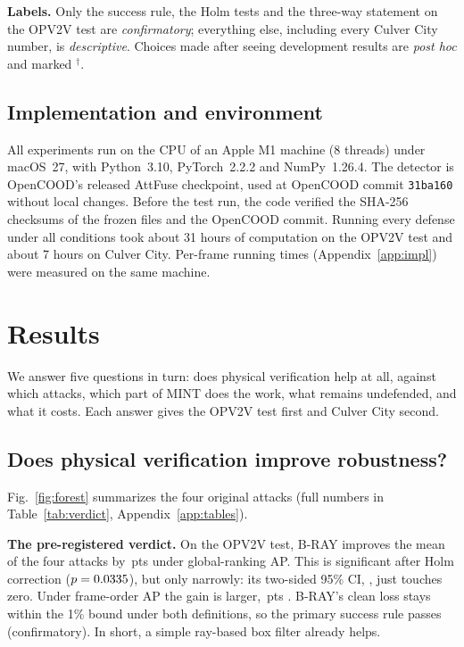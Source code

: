 \documentclass[conference]{IEEEtran}
\newcommand{\mint}{MINT}
\newcommand{\pts}{\,pts}
\begin{document}
\textbf{Labels.} Only the success rule, the Holm tests and the three-way statement on the OPV2V test are
\emph{confirmatory}; everything else, including every Culver City number, is \emph{descriptive}. Choices made after
seeing development results are \emph{post hoc} and marked $^\dagger$.

\subsection{Implementation and environment}
\label{sec:env}
All experiments run on the CPU of an Apple M1 machine (8 threads) under macOS~27, with Python~3.10,
PyTorch~2.2.2 and NumPy~1.26.4. The detector is OpenCOOD's released AttFuse checkpoint, used at OpenCOOD
commit \texttt{31ba160} without local changes. Before the test run, the code verified the SHA-256 checksums of
the frozen files and the OpenCOOD commit. Running every defense under all \NumConditions{} conditions took
about 31 hours of computation on the OPV2V test and about 7 hours on Culver City. Per-frame running times
(Appendix~\ref{app:impl}) were measured on the same machine.

\section{Results}
\label{sec:results}
We answer five questions in turn: does physical verification help at all, against which attacks, which part of
\mint{} does the work, what remains undefended, and what it costs. Each answer gives the OPV2V test first and
Culver City second.

\subsection{Does physical verification improve robustness?}
\label{sec:main}
Fig.~\ref{fig:forest} summarizes the four original attacks (full numbers in Table~\ref{tab:verdict},
Appendix~\ref{app:tables}).

\textbf{The pre-registered verdict.} On the OPV2V test, B-RAY improves the mean of the four attacks by
\VGlobBRAYDelta\pts{} under global-ranking AP. This is significant after Holm correction ($p=0.0335$), but
only narrowly: its two-sided 95\% CI, \VGlobBRAYCI, just touches zero. Under frame-order AP the gain is larger,
\VFrameBRAYDelta\pts{} \VFrameBRAYCI. B-RAY's clean loss stays within the 1\% bound under both definitions, so
the primary success rule passes (confirmatory). In short, a simple ray-based box filter already helps.
\end{document}
